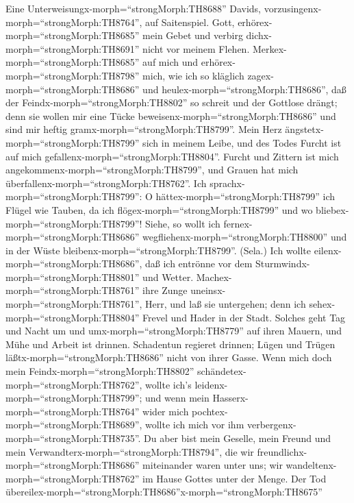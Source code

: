  Eine Unterweisungx-morph=``strongMorph:TH8688'' Davids,
vorzusingenx-morph=``strongMorph:TH8764'', auf Saitenspiel. Gott,
erhörex-morph=``strongMorph:TH8685'' mein Gebet und verbirg
dichx-morph=``strongMorph:TH8691'' nicht vor meinem Flehen. 
Merkex-morph=``strongMorph:TH8685'' auf mich und
erhörex-morph=``strongMorph:TH8798'' mich, wie ich so kläglich
zagex-morph=``strongMorph:TH8686'' und
heulex-morph=``strongMorph:TH8686'',  daß der
Feindx-morph=``strongMorph:TH8802'' so schreit und der Gottlose drängt;
denn sie wollen mir eine Tücke beweisenx-morph=``strongMorph:TH8686''
und sind mir heftig gramx-morph=``strongMorph:TH8799''. 
Mein Herz ängstetx-morph=``strongMorph:TH8799'' sich in meinem Leibe,
und des Todes Furcht ist auf mich
gefallenx-morph=``strongMorph:TH8804''.  Furcht und Zittern
ist mich angekommenx-morph=``strongMorph:TH8799'', und Grauen hat mich
überfallenx-morph=``strongMorph:TH8762''.  Ich
sprachx-morph=``strongMorph:TH8799'': O
hättex-morph=``strongMorph:TH8799'' ich Flügel wie Tauben, da ich
flögex-morph=``strongMorph:TH8799'' und wo
bliebex-morph=``strongMorph:TH8799''!  Siehe, so wollt ich
fernex-morph=``strongMorph:TH8686''
wegfliehenx-morph=``strongMorph:TH8800'' und in der Wüste
bleibenx-morph=``strongMorph:TH8799''. (Sela.)  Ich wollte
eilenx-morph=``strongMorph:TH8686'', daß ich entrönne vor dem
Sturmwindx-morph=``strongMorph:TH8801'' und Wetter. 
Machex-morph=``strongMorph:TH8761'' ihre Zunge
uneinsx-morph=``strongMorph:TH8761'', Herr, und laß sie untergehen; denn
ich sehex-morph=``strongMorph:TH8804'' Frevel und Hader in der Stadt.
 Solches geht Tag und Nacht um und
umx-morph=``strongMorph:TH8779'' auf ihren Mauern, und Mühe und Arbeit
ist drinnen.  Schadentun regieret drinnen; Lügen und Trügen
läßtx-morph=``strongMorph:TH8686'' nicht von ihrer Gasse. 
Wenn mich doch mein Feindx-morph=``strongMorph:TH8802''
schändetex-morph=``strongMorph:TH8762'', wollte ich's
leidenx-morph=``strongMorph:TH8799''; und wenn mein
Hasserx-morph=``strongMorph:TH8764'' wider mich
pochtex-morph=``strongMorph:TH8689'', wollte ich mich vor ihm
verbergenx-morph=``strongMorph:TH8735''.  Du aber bist mein
Geselle, mein Freund und mein Verwandterx-morph=``strongMorph:TH8794'',
 die wir freundlichx-morph=``strongMorph:TH8686''
miteinander waren unter uns; wir wandeltenx-morph=``strongMorph:TH8762''
im Hause Gottes unter der Menge.  Der Tod
übereilex-morph=``strongMorph:TH8686''\textbar x-morph=``strongMorph:TH8675''
